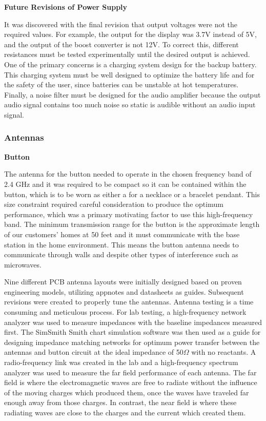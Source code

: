 \documentclass[journal,compsoc]{IEEEtran}
\begin{document}
\textbf {Future Revisions of Power Supply}

It was discovered with the final revision that output voltages were not the required values.  For example, the output for the display was 3.7V instead of 5V, and the output of the boost converter is not 12V.  To correct this, different resistances must be tested experimentally until the desired output is achieved.  One of the primary concerns is a charging system design for the backup battery.  This charging system must be well designed to optimize the battery life and for the safety of the user, since batteries can be unstable at hot temperatures.  Finally, a noise filter must be designed for the audio amplifier because the output audio signal contains too much noise so static is audible without an audio input signal.


\subsubsection {Antennas}

\textbf {Button}

The antenna for the button needed to operate in the chosen frequency band of 2.4 GHz and it was required to be compact so it can be contained within the button, which is to be worn as either a for a necklace or a bracelet pendant.  This size constraint required careful consideration to produce the optimum performance, which was a primary motivating factor to use this high-frequency band.  The minimum transmission range for the button is the approximate length of our customers’ homes at 50 feet and it must communicate with the base station in the home environment.  This means the button antenna needs to communicate through walls and despite other types of interference such as microwaves.

Nine different PCB antenna layouts were initially designed based on proven engineering models, utilizing appnotes and datasheets as guides.  Subsequent revisions were created to properly tune the antennas.  Antenna testing is a time consuming and meticulous process.  For lab testing, a high-frequency network analyzer was used to measure impedances with the baseline impedances measured first.  The SimSmith Smith chart simulation software was then used as a guide for designing impedance matching networks for optimum power transfer between the antennas and button circuit at the ideal impedance of 50$\Omega$ with no reactants.  A radio-frequency link was created in the lab and a high-frequency spectrum analyzer was used to measure the far field performance of each antenna.  The far field is where the electromagnetic waves are free to radiate without the influence of the moving charges which produced them, once the waves have traveled far enough away from those charges.  In contrast, the near field is where these radiating waves are close to the charges and the current which created them.
\end{document}

